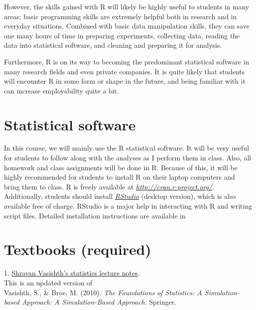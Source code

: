 \documentclass[a4paper,12pt]{article}
\begin{document}
	However, the skills gained with R will likely be highly useful to students in many areas: basic programming skills are extremely helpful both in research and in everyday situations. Combined with basic data manipulation skills, they can save one many hours of time in preparing experiments, collecting data, reading the data into statistical software, and cleaning and preparing it for analysis. 
	
	Furthermore, R is on its way to becoming the predominant statistical software in many research fields and even private companies. It is quite likely that students will encounter R in some form or shape in the future, and being familiar with it can increase employability quite a bit.
	
	
	\setlength{\parindent}{0cm}
	
	\section{Statistical software}
	In this course, we will mainly use the R statistical software. It will be very useful for students to follow along with the analyses as I perform them in class. Also, all homework and class assignments will be done in R. Because of this, it will be highly recommended for students to install R on their laptop computers and bring them to class. R is freely available at \href{http://cran.r-project.org/}{\textit{http://cran.r-project.org/}}. Additionally, students should install \href{http://www.rstudio.com/products/RStudio/#Desk}{\textit{RStudio}} (desktop version), which is also available free of charge. RStudio is a major help in interacting with R and writing script files. Detailed installation instructions are available in 
	
	\section{Textbooks (required)} 
	1.  \href{https://github.com/vasishth/Statistics-lecture-notes-Potsdam/blob/master/IntroductoryStatistics/StatisticsNotesVasishth.pdf}{Shravan Vasishth's statistics  lecture notes}. \\

	This is an updated version of\\

	Vasishth, S., \& Broe, M. (2010). \textit{The Foundations of Statistics: A Simulation-based Approach: A Simulation-Based Approach.} Springer.
	\\
\end{document}
